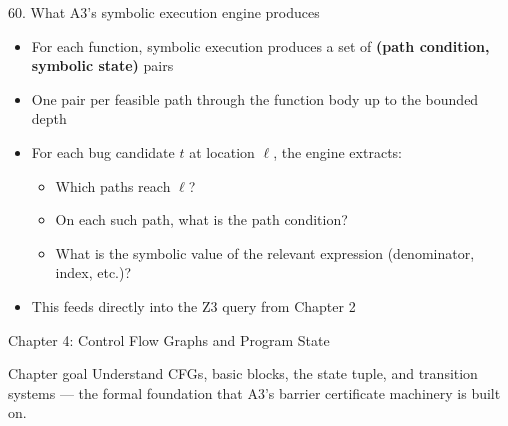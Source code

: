 \documentclass[aspectratio=169]{beamer}
\begin{document}
\begin{frame}{60. What A3's symbolic execution engine produces}
\begin{itemize}
  \item For each function, symbolic execution produces a set of \textbf{(path condition, symbolic state)} pairs
  \item One pair per feasible path through the function body up to the bounded depth
  \item For each bug candidate \(t\) at location \(\ell\), the engine extracts:
    \begin{itemize}
      \item Which paths reach \(\ell\)?
      \item On each such path, what is the path condition?
      \item What is the symbolic value of the relevant expression (denominator, index, etc.)?
    \end{itemize}
  \item This feeds directly into the Z3 query from Chapter 2
\end{itemize}
\end{frame}


\begin{frame}{Chapter 4: Control Flow Graphs and Program State}
\begin{block}{Chapter goal}
Understand CFGs, basic blocks, the state tuple, and transition systems ---
the formal foundation that A3's barrier certificate machinery is built on.
\end{block}
\end{frame}
\end{document}
